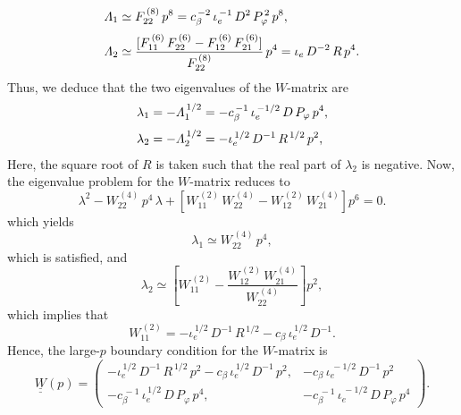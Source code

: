 \documentclass[12pt,prb,aps,notitlepage]{revtex4-1}
\begin{document}
 \begin{align}
 {\mit\Lambda}_1&\simeq F_{22}^{\,(8)}\,p^8=  c_\beta^{\,-2}\,\iota_e^{\,-1}\,D^2\,P_\varphi^{\,2}\,p^8,\\[0.5ex]
 {\mit\Lambda}_2 &\simeq \frac{[F_{11}^{\,(6)}\,F_{22}^{\,(6)} - F_{12}^{\,(6)}\,F_{21}^{\,(6)}]}{F_{22}^{\,(8)}}\,p^4= \iota_e\,D^{-2}\,R\,p^4.
 \end{align}
 Thus, we deduce that the two eigenvalues of the $W$-matrix are 
 \begin{align}
 \lambda_1&=-{\mit\Lambda}_1^{\,1/2}= -c_\beta^{\,-1}\,\iota_e^{\,-1/2}\,D\,P_\varphi\,p^4,\\[0.5ex]
 \lambda_2&=-{\mit\Lambda}_2^{\,1/2}=-\iota_e^{\,1/2}\,D^{-1}\,R^{\,1/2}\,p^2,
 \end{align}
 Here, the square root of $R$ is taken such that the real part of $\lambda_2$ is negative. 
  Now, the eigenvalue problem for the $W$-matrix reduces to 
 \begin{equation}
 \lambda^{2} - W_{22}^{\,(4)}\,p^4\,\lambda + \left[W_{11}^{\,(2)}\,W_{22}^{\,(4)} - W_{12}^{\,(2)}\,W_{21}^{\,(4)}\right]p^6 = 0.
 \end{equation}
which yields
\begin{equation}
\lambda_1\simeq W_{22}^{\,(4)}\,p^4,
\end{equation}
which is satisfied, and
\begin{equation}
\lambda_2 \simeq \left[W_{11}^{\,(2)} - \frac{W_{12}^{\,(2)}\,W_{21}^{\,(4)}}{W_{22}^{\,(4)}}\right]p^2,
\end{equation}
 which implies that
 \begin{equation}
 W_{11}^{\,(2)} = -\iota_e^{\,1/2}\,D^{-1}\,R^{\,1/2}-c_\beta\,\iota_e^{\,1/2}\,D^{-1}.
 \end{equation}
 Hence, the large-$p$ boundary condition for the $W$-matrix
 is
 \begin{equation}
 \underline{\underline{W}}(p) =  \left(\begin{array}{cc} -\iota_e^{\,1/2}\,D^{-1}\,R^{\,1/2}\,p^2-c_\beta\,\iota_e^{\,1/2}\,D^{-1}\,p^2,& - c_\beta\,\iota_e^{\,-1/2}\,D^{-1}\,p^2\\-c_\beta^{\,-1}\,\iota_e^{\,1/2}\,D\,P_\varphi\,p^4,&-c_\beta^{\,-1}\,\iota_e^{\,-1/2}\,D\,P_\varphi\,p^4\end{array}\right).
 \end{equation}
\end{document}
